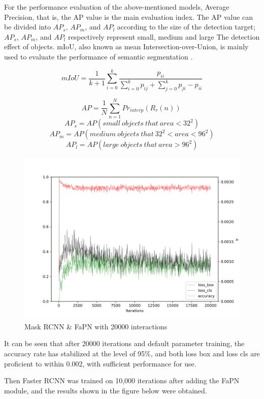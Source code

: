For the performance evaluation of the above-mentioned models, Average Precision, that is, the AP value is the main evaluation index. The AP value can be divided into $AP_s$, $AP_m$, and $AP_l$ according to the size of the detection target; $AP_s$, $AP_m$, and $AP_l$ respectively represent small, medium and large The detection effect of objects. mIoU, also known as mean Intersection-over-Union, is mainly used to evaluate the performance of semantic segmentation \cite{padilla2021comparative}.

$$ mIoU = \frac{1}{k+1} \sum_{i=0}^{k}\frac{p_{ii}}{\sum_{i=0}^{k}p_{ij}+\sum_{j=0}^{k}p_{ji}-p_{ii}}$$

$$AP = \frac{1}{N}\sum_{n=1}^{N}Pr_{interp}(R_r(n))\ $$
$$AP_s = AP (small\ objects\ that\ area < 32^2)$$
$$AP_m = AP (medium\ objects\ that\ 32^2 < area < 96^2)$$
$$AP_l = AP (large\ objects\ that\ area > 96^2)$$

\begin{figure}[htb]
    \centering
    \includegraphics[width=1\textwidth]{figures/mask_rcnn_r_50_fapn_1x_20000iter.png}
    \caption{Mask RCNN \& FaPN with 20000 interactions}\label{mask_rcnn_r_50_fapn_1x_20000iter}
\end{figure}


It can be seen that after 20000 iterations and default parameter training, the accuracy rate has stabilized at the level of 95\%, and both loss box and loss cls are proficient to within 0.002, with sufficient performance for use.


Then Faster RCNN \cite{ren2015faster} was trained on 10,000 iterations after adding the FaPN module, and the results shown in the figure below were obtained.

